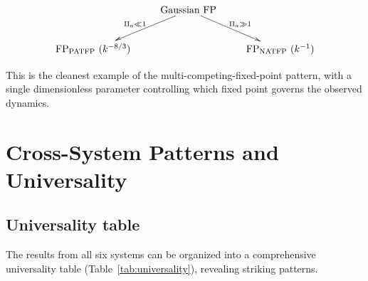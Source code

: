 {\small
\begin{equation}
 \xymatrix{
& \text{Gaussian FP} \ar[dl]_{\Pi_a \ll 1} \ar[dr]^{\Pi_a \gg 1} & \\
\text{FP}_{\PATFP}~(k^{-8/3}) & & \text{FP}_{\NATFP}~(k^{-1})
}
\end{equation}
}

This is the cleanest example of the multi-competing-fixed-point pattern, with a single dimensionless parameter controlling which fixed point governs the observed dynamics.

\section{Cross-System Patterns and Universality\label{sec:patterns}}

\subsection{Universality table}

The results from all six systems can be organized into a comprehensive universality table (Table~\ref{tab:universality}), revealing striking patterns.

\begin{table}[ht]
\centering \footnotesize
\caption{Universality table: comparison of fixed-point structures, spectral exponents, and key parameters across all six systems. ``\#FP'' denotes the number of distinct fixed points.}\label{tab:universality}
%
\end{table}

